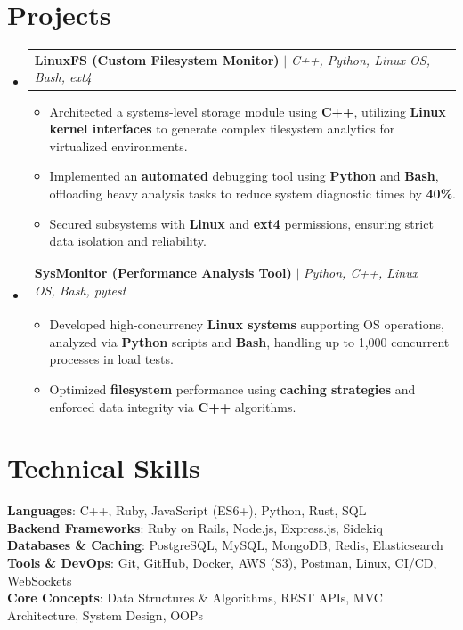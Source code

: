 \documentclass[letterpaper, 10pt]{article}
\makeatletter
\newcommand{\resumeItem}[1]{
  \item\small{
    {#1 \vspace{-1pt}}
  }
}
\newcommand{\resumeProjectHeading}[2]{
    \item
    \begin{tabular*}{0.97\textwidth}{l@{\extracolsep{\fill}}r}
      \small#1 & #2 \\
    \end{tabular*}\vspace{-7pt}
}
\newcommand{\resumeSubHeadingListStart}{\begin{itemize}[leftmargin=0.05in, label={}]}
\newcommand{\resumeSubHeadingListEnd}{\end{itemize}}
\newcommand{\resumeItemListStart}{\begin{itemize}[itemsep=3pt, parsep=0pt]}
\newcommand{\resumeItemListEnd}{\end{itemize}\vspace{-5pt}}
\makeatother
\begin{document}
\section{Projects}
  \resumeSubHeadingListStart
    \resumeProjectHeading
      {\textbf{LinuxFS (Custom Filesystem Monitor)} $|$ \emph{C++, Python, Linux OS, Bash, ext4}}{}
      \resumeItemListStart
        \resumeItem{Architected a systems-level storage module using \textbf{C++}, utilizing \textbf{Linux kernel interfaces} to generate complex filesystem analytics for virtualized environments.}
        \resumeItem{Implemented an \textbf{automated} debugging tool using \textbf{Python} and \textbf{Bash}, offloading heavy analysis tasks to reduce system diagnostic times by \textbf{40\%}.}
        \resumeItem{Secured subsystems with \textbf{Linux} and \textbf{ext4} permissions, ensuring strict data isolation and reliability.}
      \resumeItemListEnd

    \resumeProjectHeading
      {\textbf{SysMonitor (Performance Analysis Tool)} $|$ \emph{Python, C++, Linux OS, Bash, pytest}}{}
      \resumeItemListStart
        \resumeItem{Developed high-concurrency \textbf{Linux systems} supporting OS operations, analyzed via \textbf{Python} scripts and \textbf{Bash}, handling up to 1,000 concurrent processes in load tests.}
        \resumeItem{Optimized \textbf{filesystem} performance using \textbf{caching strategies} and enforced data integrity via \textbf{C++} algorithms.}
      \resumeItemListEnd

  \resumeSubHeadingListEnd

\section{Technical Skills}
 \begin{itemize}[leftmargin=0.15in, label={}]
    \small{\item{
     \textbf{Languages}{: C++, Ruby, JavaScript (ES6+), Python, Rust, SQL} \\
     \textbf{Backend Frameworks}{: Ruby on Rails, Node.js, Express.js, Sidekiq} \\
     \textbf{Databases \& Caching}{: PostgreSQL, MySQL, MongoDB, Redis, Elasticsearch} \\
     \textbf{Tools \& DevOps}{: Git, GitHub, Docker, AWS (S3), Postman, Linux, CI/CD, WebSockets} \\
     \textbf{Core Concepts}{: Data Structures \& Algorithms, REST APIs, MVC Architecture, System Design, OOPs}
    }}
 \end{itemize}
\end{document}
